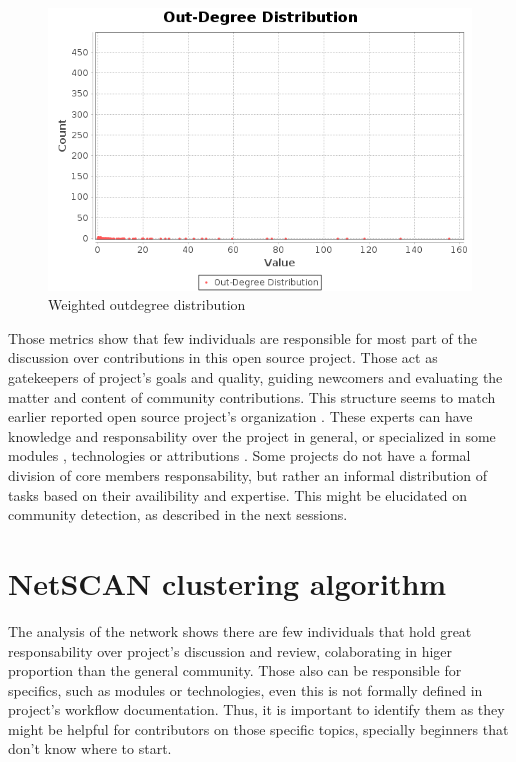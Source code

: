 \documentclass[conference]{IEEEtran}
\begin{document}
\begin{figure}[htbp]
\centerline{\includegraphics[width=\linewidth]{images/outdegree-weighted}}
\caption{Weighted outdegree distribution}
\label{fig:outdegree-weighted}
\end{figure}

Those metrics show that few individuals are responsible for most part of the discussion over contributions in this open source project. Those act as gatekeepers of project's goals and quality, guiding newcomers and evaluating the matter and content of community contributions. This structure seems to match earlier reported open source project's organization \cite{bergquist2001}. These experts can have knowledge and responsability over the project in general, or specialized in some modules \cite{firefox2018}, technologies or attributions \cite{debian2018}. Some projects do not have a formal division of core members responsability, but rather an informal distribution of tasks based on their availibility and expertise. This might be elucidated on community detection, as described in the next sessions.

\section{NetSCAN clustering algorithm}

The analysis of the network shows there are few individuals that hold great responsability over project's discussion and review, colaborating in higer proportion than the general community. Those also can be responsible for specifics, such as modules or technologies, even this is not formally defined in project's workflow documentation. Thus, it is important to identify them as they might be helpful for contributors on those specific topics, specially beginners that don't know where to start.
\end{document}
